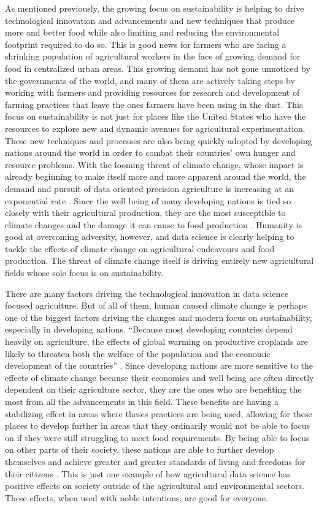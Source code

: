 \documentclass[sigconf]{acmart}
\begin{document}
As mentioned previously, the growing focus on sustainability is helping to drive technological innovation and advancements and new techniques that produce more and better food while also limiting and reducing the environmental footprint required to do so. This is good news for farmers who are facing a shrinking population of agricultural workers in the face of growing demand for food in centralized urban areas. This growing demand has not gone unnoticed by the governments of the world, and many of them are actively taking steps by working with farmers and providing resources for research and development of farming practices that leave the ones farmers have been using in the dust. This focus on sustainability is not just for places like the United States who have the resources to explore new and dynamic avenues for agricultural experimentation. These new techniques and processes are also being quickly adopted by developing nations around the world in order to combat their countries' own hunger and resource problems. With the looming threat of climate change, whose impact is already beginning to make itself more and more apparent around the world, the demand and pursuit of data oriented precision agriculture is increasing at an exponential rate \cite{trauger2009}. Since the well being of many developing nations is tied so closely with their agricultural production, they are the most susceptible to climate changes and the damage it can cause to food production \cite{mendelsohn1999}. Humanity is good at overcoming adversity, however, and data science is clearly helping to tackle the effects of climate change on agricultural endeavours and food production. The threat of climate change itself is driving entirely new agricultural fields whose sole focus is on sustainability.

There are many factors driving the technological innovation in data science focused agriculture. But of all of them, human caused climate change is perhaps one of the biggest factors driving the changes and modern focus on sustainability, especially in developing nations. ``Because most developing countries depend heavily on agriculture, the effects of global warming on productive croplands are likely to threaten both the welfare of the population and the economic development of the countries'' \cite{mendelsohn1999}. Since developing nations are more sensitive to the effects of climate change because their economies and well being are often directly dependent on their agriculture sector, they are the ones who are benefiting the most from all the advancements in this field. These benefits are having a stabilizing effect in areas where theses practices are being used, allowing for these places to develop further in areas that they ordinarily would not be able to focus on if they were still struggling to meet food requirements. By being able to focus on other parts of their society, these nations are able to further develop themselves and achieve greater and greater standards of living and freedoms for their citizens \cite{lee2005}. This is just one example of how agricultural data science has positive effects on society outside of the agricultural and environmental sectors. These effects, when used with noble intentions, are good for everyone.
\end{document}
